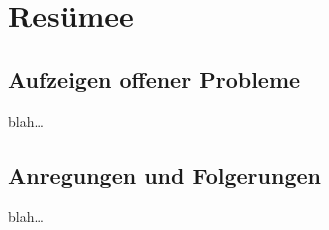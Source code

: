 \chapter{Resümee}


\section{Aufzeigen offener Probleme}
blah\dots


\section{Anregungen und Folgerungen}
blah\dots

